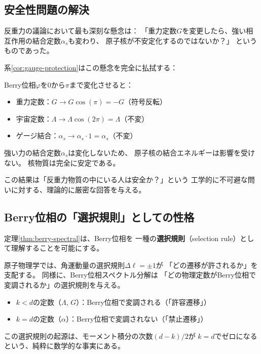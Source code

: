 \subsection{安全性問題の解決}

反重力の議論において最も深刻な懸念は：
「重力定数$G$を変更したら、強い相互作用の結合定数$\alpha_s$も変わり、
原子核が不安定化するのではないか？」
というものであった。

系\ref{cor:gauge-protection}はこの懸念を完全に払拭する：

\begin{warningbox}[安全性の数学的保証]
Berry位相$\varphi$を$0$から$\pi$まで変化させると：
\begin{itemize}
\item 重力定数：$G \to G\cos(\pi) = -G$（符号反転）
\item 宇宙定数：$\Lambda \to \Lambda\cos(2\pi) = \Lambda$（不変）
\item ゲージ結合：$\alpha_s \to \alpha_s \cdot 1 = \alpha_s$（不変）
\end{itemize}
強い力の結合定数$\alpha_s$は変化しないため、
原子核の結合エネルギーは影響を受けない。
核物質は完全に安定である。
\end{warningbox}

\noindent
この結果は「反重力物質の中にいる人は安全か？」という
工学的に不可避な問いに対する、理論的に厳密な回答を与える。

\subsection{Berry位相の「選択規則」としての性格}

定理\ref{thm:berry-spectral}は、Berry位相を
一種の\textbf{選択規則}（selection rule）として理解することを可能にする。

原子物理学では、角運動量の選択規則$\Delta\ell = \pm 1$が
「どの遷移が許されるか」を支配する。
同様に、Berry位相スペクトル分解は
「どの物理定数がBerry位相で変調されるか」の選択規則を与える。

\begin{itemize}
\item $k < d$の定数（$\Lambda$, $G$）：Berry位相で変調される（「許容遷移」）
\item $k = d$の定数（$\alpha$）：Berry位相で変調されない（「禁止遷移」）
\end{itemize}

この選択規則の起源は、モーメント積分の次数$(d-k)/2$が
$k=d$でゼロになるという、純粋に数学的な事実にある。


